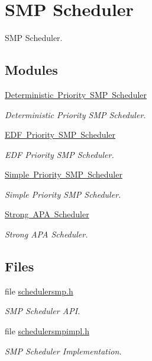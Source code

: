 \hypertarget{group__RTEMSScoreSchedulerSMP}{}\section{S\+MP Scheduler}
\label{group__RTEMSScoreSchedulerSMP}


S\+MP Scheduler.  


\subsection*{Modules}
\begin{DoxyCompactItemize}
\item 
\mbox{\hyperlink{group__RTEMSScoreSchedulerPrioritySMP}{Deterministic Priority S\+M\+P Scheduler}}
\begin{DoxyCompactList}\small\item\em Deterministic Priority S\+MP Scheduler. \end{DoxyCompactList}\item 
\mbox{\hyperlink{group__RTEMSScoreSchedulerSMPEDF}{E\+D\+F Priority S\+M\+P Scheduler}}
\begin{DoxyCompactList}\small\item\em E\+DF Priority S\+MP Scheduler. \end{DoxyCompactList}\item 
\mbox{\hyperlink{group__RTEMSScoreSchedulerSMPSimple}{Simple Priority S\+M\+P Scheduler}}
\begin{DoxyCompactList}\small\item\em Simple Priority S\+MP Scheduler. \end{DoxyCompactList}\item 
\mbox{\hyperlink{group__RTEMSScoreSchedulerStrongAPA}{Strong A\+P\+A Scheduler}}
\begin{DoxyCompactList}\small\item\em Strong A\+PA Scheduler. \end{DoxyCompactList}\end{DoxyCompactItemize}
\subsection*{Files}
\begin{DoxyCompactItemize}
\item 
file \mbox{\hyperlink{schedulersmp_8h}{schedulersmp.\+h}}
\begin{DoxyCompactList}\small\item\em S\+MP Scheduler A\+PI. \end{DoxyCompactList}\item 
file \mbox{\hyperlink{schedulersmpimpl_8h}{schedulersmpimpl.\+h}}
\begin{DoxyCompactList}\small\item\em S\+MP Scheduler Implementation. \end{DoxyCompactList}\end{DoxyCompactItemize}
